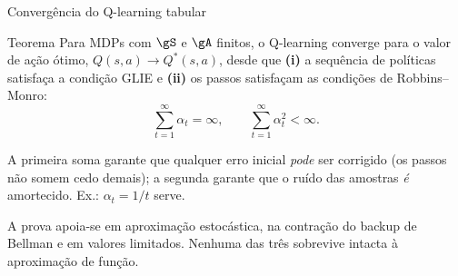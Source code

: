 \documentclass[aspectratio=169, 11pt]{beamer}
\newcommand{\Qstar}{Q^{*}}
\begin{document}
\begin{frame}{Convergência do Q-learning tabular}

  \begin{teobox}{Teorema}
    Para MDPs com $\gS$ e $\gA$ finitos, o Q-learning converge para o valor
    de ação ótimo, $Q(s,a) \to \Qstar(s,a)$, desde que \textbf{(i)} a
    sequência de políticas satisfaça a condição GLIE e \textbf{(ii)} os
    passos satisfaçam as condições de Robbins--Monro:
    \vspace{-0.7em}
    \[ \sum_{t=1}^{\infty} \alpha_t = \infty, \qquad
       \sum_{t=1}^{\infty} \alpha_t^2 < \infty. \]
  \end{teobox}

  \begin{ideiabox}
    A primeira soma garante que qualquer erro inicial \emph{pode} ser
    corrigido (os passos não somem cedo demais); a segunda garante que o
    ruído das amostras \emph{é} amortecido. Ex.: $\alpha_t = 1/t$ serve.
  \end{ideiabox}

  {\small A prova apoia-se em aproximação estocástica, na contração do
  backup de Bellman e em valores limitados. \alert{Nenhuma das três
  sobrevive intacta à aproximação de função.}}
\end{frame}
\end{document}
